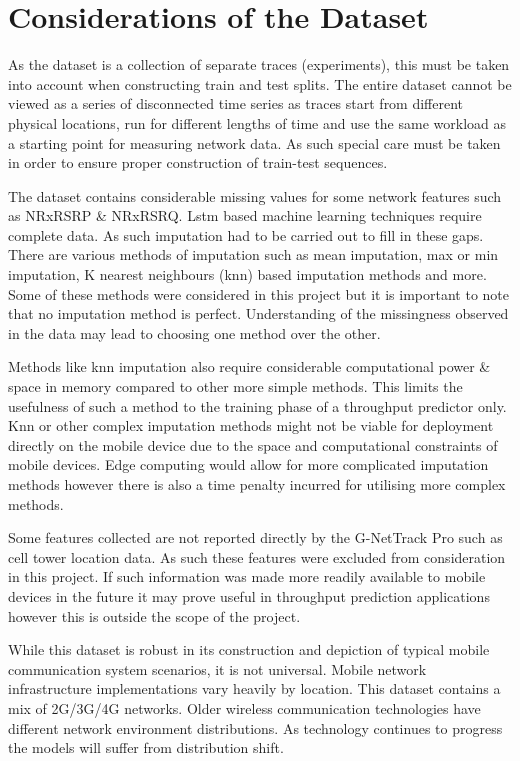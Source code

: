\newpage
\section{Considerations of the Dataset}

As the dataset is a collection of separate traces (experiments), this must be taken into account when constructing train and test splits. The entire dataset cannot be viewed as a series of disconnected time series as traces start from different physical locations, run for different lengths of time and use the same workload as a starting point for measuring network data. As such special care must be taken in order to ensure proper construction of train-test sequences.  

The dataset contains considerable missing values for some network features such as NRxRSRP \& NRxRSRQ. Lstm based machine learning techniques require complete data. As such imputation had to be carried out to fill in these gaps. There are various methods of imputation such as mean imputation, max or min imputation, K nearest neighbours (knn) based imputation \cite{batista2002study} methods and more. Some of these methods were considered in this project but it is important to note that no imputation method is perfect. Understanding of the missingness observed in the data may lead to choosing one method over the other. 

Methods like knn imputation also require considerable computational power \& space in memory compared to other more simple methods. This limits the usefulness of such a method to the training phase of a throughput predictor only. Knn or other complex imputation methods might not be viable for deployment directly on the mobile device due to the space and computational constraints of mobile devices. Edge computing would allow for more complicated imputation methods however there is also a time penalty incurred for utilising more complex methods.

Some features collected are not reported directly by the G-NetTrack Pro such as cell tower location data. As such these features were excluded from consideration in this project. If such information was made more readily available to mobile devices in the future it may prove useful in throughput prediction applications however this is outside the scope of the project.

While this dataset is robust in its construction and depiction of typical mobile communication system scenarios, it is not universal. Mobile network infrastructure implementations vary heavily by location. This dataset contains a mix of 2G/3G/4G networks. Older wireless communication technologies have different network environment distributions. As technology continues to progress the models will suffer from distribution shift. 
\newpage
